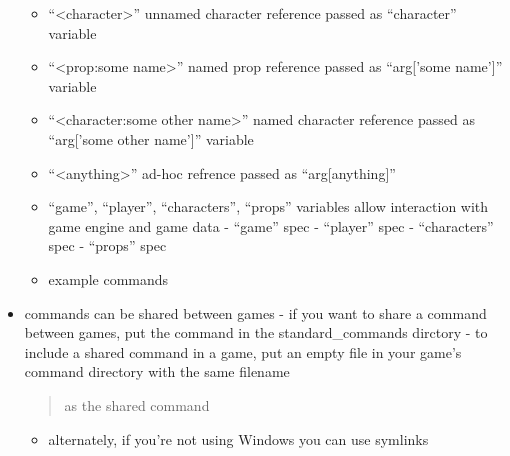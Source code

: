 \documentclass[letterpaper,10pt,english]{manual}
\begin{document}
\begin{itemize}
\begin{itemize}
\item {} 
``\textless{}character\textgreater{}'' unnamed character reference passed as ``character'' variable

\item {} 
``\textless{}prop:some name\textgreater{}'' named prop reference passed as ``arg{[}'some name'{]}'' variable

\item {} 
``\textless{}character:some other name\textgreater{}'' named character reference passed as ``arg{[}'some other name'{]}'' variable

\item {} 
``\textless{}anything\textgreater{}'' ad-hoc refrence passed as ``arg{[}anything{]}''

\end{itemize}
\begin{itemize}
\item {} 
``game'', ``player'', ``characters'', ``props'' variables allow interaction with game engine and game data
- ``game'' spec
- ``player'' spec
- ``characters'' spec
- ``props'' spec

\item {} 
example commands

\end{itemize}

\item {} 
commands can be shared between games
- if you want to share a command between games, put the command in the standard\_commands dirctory
- to include a shared command in a game, put an empty file in your game's command directory with the same filename
\begin{quote}

as the shared command
\end{quote}
\begin{itemize}
\item {} 
alternately, if you're not using Windows you can use symlinks

\end{itemize}

\end{itemize}
\end{document}
